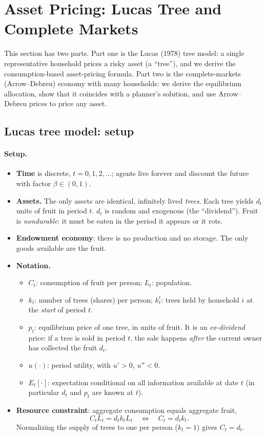 \section{Asset Pricing: Lucas Tree and Complete Markets}

This section has two parts. Part one is the Lucas (1978) tree model: a single representative household prices a risky asset (a ``tree''), and we derive the consumption-based asset-pricing formula. Part two is the complete-markets (Arrow--Debreu) economy with many households: we derive the equilibrium allocation, show that it coincides with a planner's solution, and use Arrow--Debreu prices to price any asset.

\subsection{Lucas tree model: setup }

\paragraph{Setup.}
\begin{itemize}
  \item \textbf{Time} is discrete, $t=0,1,2,\dots$; agents live forever and discount the future with factor $\beta\in(0,1)$.
  \item \textbf{Assets.} The only assets are identical, infinitely lived \emph{trees}. Each tree yields $d_t$ units of fruit in period $t$. $d_t$ is random and exogenous (the ``dividend''). Fruit is \emph{nondurable}: it must be eaten in the period it appears or it rots.
  \item \textbf{Endowment economy}: there is no production and no storage. The only goods available are the fruit.
  \item \textbf{Notation.}
  \begin{itemize}
    \item $C_t$: consumption of fruit per person; $L_t$: population.
    \item $k_t$: number of trees (shares) per person; $k^i_t$: trees held by household $i$ at the \emph{start} of period $t$.
    \item $p_t$: equilibrium price of one tree, in units of fruit. It is an \emph{ex-dividend} price: if a tree is sold in period $t$, the sale happens \emph{after} the current owner has collected the fruit $d_t$.
    \item $u(\cdot)$: period utility, with $u'>0$, $u''<0$.
    \item $E_t[\cdot]$: expectation conditional on all information available at date $t$ (in particular $d_t$ and $p_t$ are known at $t$).
  \end{itemize}
  \item \textbf{Resource constraint}: aggregate consumption equals aggregate fruit,
  \begin{equation}\label{eq:s4_rc}
    C_tL_t = d_t k_t L_t \quad\Longleftrightarrow\quad C_t = d_t k_t .
  \end{equation}
  Normalizing the supply of trees to one per person ($k_t=1$) gives $C_t=d_t$.
\end{itemize}

